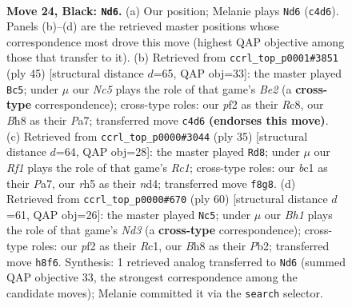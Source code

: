\documentclass[11pt]{article}
\begin{document}
\clearpage

\begin{figure}[p]\centering
\begin{subfigure}{0.46\textwidth}\centering
\resizebox{\linewidth}{!}{%
\newchessgame
\chessboard[
  setfen={r4r1b/1ppb1k2/p7/4pp1R/2n5/P1N2N2/1PB1KPP1/R1B5 b - - 0 24},
  showmover=false,
  pgfstyle=straightmove, color=movearrow, markmove={c4-d6}
]}
\caption{}
\end{subfigure}\hfill
\begin{subfigure}{0.46\textwidth}\centering
\resizebox{\linewidth}{!}{%
\newchessgame
\chessboard[
  setfen={2r2rk1/pR1nbpp1/2p1b2p/8/7N/2B3P1/P3PPBP/R5K1 b - - 5 23},
  showmover=false,
  pgfstyle=straightmove, color=movearrow, markmove={e7-c5}
]}
\caption{}
\end{subfigure}
\\[4pt]
\begin{subfigure}{0.46\textwidth}\centering
\resizebox{\linewidth}{!}{%
\newchessgame
\chessboard[
  setfen={r1r5/pp2kpp1/4b2p/2np4/P2N4/2P1PB2/3K1PPP/RR6 b - - 8 18},
  showmover=false,
  pgfstyle=straightmove, color=movearrow, markmove={c8-d8}
]}
\caption{}
\end{subfigure}\hfill
\begin{subfigure}{0.46\textwidth}\centering
\resizebox{\linewidth}{!}{%
\newchessgame
\chessboard[
  setfen={r5k1/p5b1/p1p1p1pp/3n4/3P4/1r1N3P/1P1B1PP1/2RR2K1 w - - 1 31},
  showmover=false,
  pgfstyle=straightmove, color=movearrow, markmove={d3-c5}
]}
\caption{}
\end{subfigure}
\caption{\textbf{Move 24, Black: \texttt{Nd6}.} (a) Our position; Melanie plays \texttt{Nd6} (\texttt{c4d6}). Panels (b)--(d) are the retrieved master positions whose correspondence most drove this move (highest QAP objective among those that transfer to it). (b) Retrieved from \texttt{ccrl\_top\_p0001\#3851} (ply 45) [structural distance $d$=65, QAP obj=33]: the master played \texttt{Bc5}; under $\mu$ our \emph{Nc5} plays the role of that game's \emph{Be2} (a \textbf{cross-type} correspondence); cross-type roles: our \emph{p}f2 as their \emph{R}c8, our \emph{B}h8 as their \emph{P}a7; transferred move \texttt{c4d6} \textbf{(endorses this move)}. (c) Retrieved from \texttt{ccrl\_top\_p0000\#3044} (ply 35) [structural distance $d$=64, QAP obj=28]: the master played \texttt{Rd8}; under $\mu$ our \emph{Rf1} plays the role of that game's \emph{Rc1}; cross-type roles: our \emph{b}c1 as their \emph{P}a7, our \emph{r}h5 as their \emph{n}d4; transferred move \texttt{f8g8}. (d) Retrieved from \texttt{ccrl\_top\_p0000\#670} (ply 60) [structural distance $d$=61, QAP obj=26]: the master played \texttt{Nc5}; under $\mu$ our \emph{Bh1} plays the role of that game's \emph{Nd3} (a \textbf{cross-type} correspondence); cross-type roles: our \emph{p}f2 as their \emph{R}c1, our \emph{B}h8 as their \emph{P}b2; transferred move \texttt{h8f6}. Synthesis: 1 retrieved analog transferred to \texttt{Nd6} (summed QAP objective 33, the strongest correspondence among the candidate moves); Melanie committed it via the \texttt{search} selector.}
\label{fig:thought-m47}
\end{figure}
\end{document}
